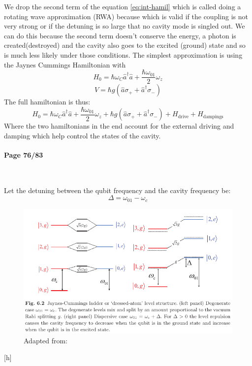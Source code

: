 \documentclass[12pt]{article}
\numberwithin{equation}{subsection}
\newcommand\page[1]{
{
\color{blue}\paragraph{
Page #1
}\mbox{}\\
}
}
\begin{document}
We drop the second term of the equation \ref{eq:int-hamil} which is called doing a rotating wave approximation (RWA) because which is valid if the coupling is not very strong or if the detuning is so large  that no cavity mode is singled out. We can do this because the second term doesn't conserve the energy, a photon is created(destroyed) and the cavity also goes to the excited (ground) state and so is much less likely under those conditions.
The simplest approximation is using the Jaynes Cummings Hamiltonian with 
\begin{equation}
    H_0 = \hbar \omega_C\hat a^\dagger \hat a +\frac{\hbar \omega_{01}}{2} \omega_z
\end{equation}
\begin{equation}
    V = \hbar g (\hat a\sigma_++ \hat a^\dagger\sigma_-)
    \label{eq:vjaynes}
\end{equation}
The full hamiltonian is thus:
\begin{equation}
    H_0 = \hbar \omega_C\hat a^\dagger \hat a +\frac{\hbar \omega_{01}}{2} \omega_z + \hbar g (\hat a\sigma_++ \hat a^\dagger\sigma_-) + H_{\textrm{drive}}+ H_{\textrm{dampings}}
\end{equation}
Where the two hamiltonians in the end account for the external driving and damping which help control the states of the cavity.
\page{76/83}
Let the detuning between the qubit frequency and the cavity frequency be:
\begin{equation}
    \Delta = \omega_{01} - \omega_c
\end{equation}
\begin{figure}[h]
\includegraphics[scale=0.5]{images/76-coupling.png}
\caption{Adapted from: \cite{Girvin2015CircuitQS}}
\label{76-coupling}
\end{figure}[h]
\end{document}
